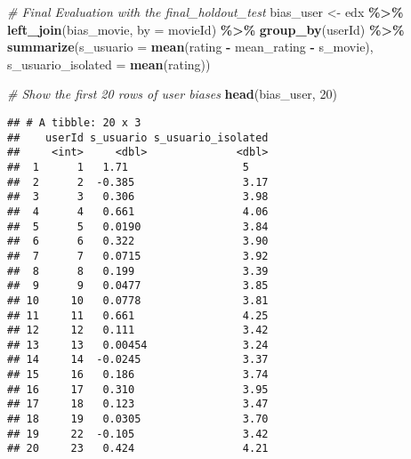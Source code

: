 \documentclass[
]{article}
\newenvironment{Shaded}{\begin{snugshade}}{\end{snugshade}}
\newcommand{\AttributeTok}[1]{\textcolor[rgb]{0.13,0.29,0.53}{#1}}
\newcommand{\CommentTok}[1]{\textcolor[rgb]{0.56,0.35,0.01}{\textit{#1}}}
\newcommand{\DecValTok}[1]{\textcolor[rgb]{0.00,0.00,0.81}{#1}}
\newcommand{\FunctionTok}[1]{\textcolor[rgb]{0.13,0.29,0.53}{\textbf{#1}}}
\newcommand{\NormalTok}[1]{#1}
\newcommand{\OtherTok}[1]{\textcolor[rgb]{0.56,0.35,0.01}{#1}}
\newcommand{\SpecialCharTok}[1]{\textcolor[rgb]{0.81,0.36,0.00}{\textbf{#1}}}
\newcommand{\StringTok}[1]{\textcolor[rgb]{0.31,0.60,0.02}{#1}}
\begin{document}
\begin{Shaded}
\begin{Highlighting}[]
\CommentTok{\# Final Evaluation with the final\_holdout\_test}
\NormalTok{bias\_user }\OtherTok{\textless{}{-}}\NormalTok{ edx }\SpecialCharTok{\%\textgreater{}\%}
  \FunctionTok{left\_join}\NormalTok{(bias\_movie, }\AttributeTok{by =} \StringTok{\textquotesingle{}movieId\textquotesingle{}}\NormalTok{) }\SpecialCharTok{\%\textgreater{}\%}
  \FunctionTok{group\_by}\NormalTok{(userId) }\SpecialCharTok{\%\textgreater{}\%}
  \FunctionTok{summarize}\NormalTok{(}\AttributeTok{s\_usuario =} \FunctionTok{mean}\NormalTok{(rating }\SpecialCharTok{{-}}\NormalTok{ mean\_rating }\SpecialCharTok{{-}}\NormalTok{ s\_movie),}
            \AttributeTok{s\_usuario\_isolated =} \FunctionTok{mean}\NormalTok{(rating))}

\CommentTok{\# Show the first 20 rows of user biases}
\FunctionTok{head}\NormalTok{(bias\_user, }\DecValTok{20}\NormalTok{)}
\end{Highlighting}
\end{Shaded}

\begin{verbatim}
## # A tibble: 20 x 3
##    userId s_usuario s_usuario_isolated
##     <int>     <dbl>              <dbl>
##  1      1   1.71                  5   
##  2      2  -0.385                 3.17
##  3      3   0.306                 3.98
##  4      4   0.661                 4.06
##  5      5   0.0190                3.84
##  6      6   0.322                 3.90
##  7      7   0.0715                3.92
##  8      8   0.199                 3.39
##  9      9   0.0477                3.85
## 10     10   0.0778                3.81
## 11     11   0.661                 4.25
## 12     12   0.111                 3.42
## 13     13   0.00454               3.24
## 14     14  -0.0245                3.37
## 15     16   0.186                 3.74
## 16     17   0.310                 3.95
## 17     18   0.123                 3.47
## 18     19   0.0305                3.70
## 19     22  -0.105                 3.42
## 20     23   0.424                 4.21
\end{verbatim}
\end{document}
